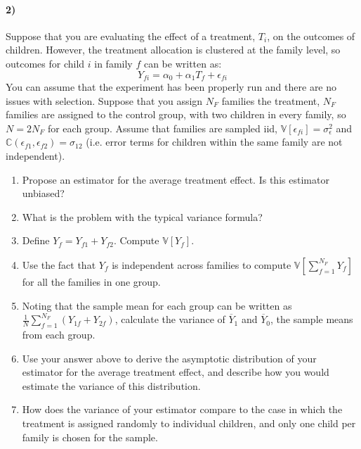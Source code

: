 \documentclass[12pt]{article}
\newcommand\ov{\overline}
\newcommand\BB{\mathbb}
\newcommand\eps{\epsilon}
\numberwithin{equation}{section}
\numberwithin{figure}{section}
\numberwithin{table}{section}
\begin{document}
\paragraph{2)} Suppose that you are evaluating the effect of a treatment, $T_i$, on the outcomes of children. However, the treatment allocation is clustered at the family level, so outcomes for child $i$ in family $f$ can be written as:
\[Y_{fi} = \alpha_0 + \alpha_1 T_{f} + \eps_{fi} \]
You can assume that the experiment has been properly run and there are no issues with selection. Suppose that you assign $N_F$ families the treatment, $N_F$ families  are assigned to the control group, with two children in every family, so $N=2N_F$ for each group. Assume that families are sampled iid, $\BB{V}[\eps_{fi}]=\sigma^2_\eps$ and $\BB{C}(\eps_{f1},\eps_{f2})=\sigma_{12}$ (i.e. error terms for children within the same family are not independent).
\begin{enumerate}
\item Propose an estimator for the average treatment effect. Is this estimator unbiased?
\item What is the problem with the typical variance formula?
\item Define $Y_f = Y_{f1}+Y_{f2}$. Compute $\BB{V}[Y_f]$.
\item Use the fact that $Y_f$ is independent across families to compute $\BB{V}[\sum_{f=1}^{N_F}Y_f]$ for all the families in one group.
\item Noting that the sample mean for each group can be written as $\frac{1}{N}\sum_{f=1}^{N_F}(Y_{1f} + Y_{2f})$, calculate the variance of $\ov{Y}_1$ and $\ov{Y}_0$, the sample means from each group.
\item Use your answer above to derive the asymptotic distribution of your estimator for the average treatment effect, and describe how you would estimate the variance of this distribution.
\item How does the variance of your estimator compare to the case in which the treatment is assigned randomly to individual children, and only one child per family is chosen for the sample.
\end{enumerate}
\end{document}
